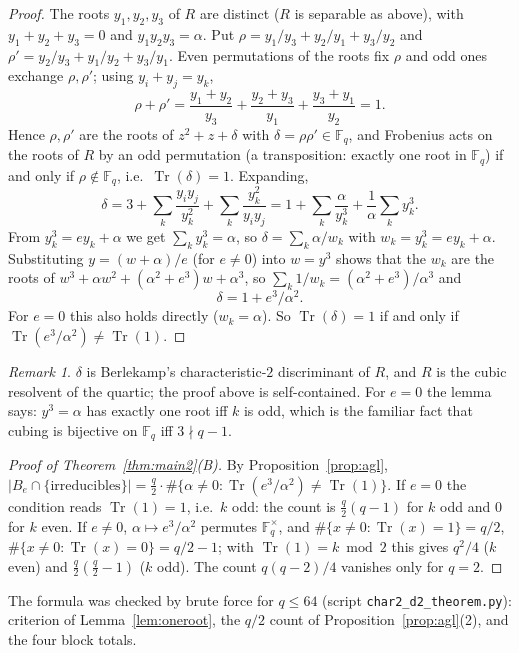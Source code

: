 \documentclass[11pt,a4paper]{amsart}
\theoremstyle{definition}
\theoremstyle{remark}
\newtheorem{remark}[theorem]{Remark}
\newcommand{\F}{\mathbb{F}}
\newcommand{\Tr}{\operatorname{Tr}}
\begin{document}
\begin{proof}
The roots $y_1,y_2,y_3$ of $R$ are distinct ($R$ is separable as above), with $y_1+y_2+y_3=0$ and $y_1y_2y_3=\alpha$.
Put $\rho=y_1/y_3+y_2/y_1+y_3/y_2$ and $\rho'=y_2/y_3+y_1/y_2+y_3/y_1$. Even permutations of the roots fix $\rho$ and
odd ones exchange $\rho,\rho'$; using $y_i+y_j=y_k$,
\[
\rho+\rho'=\frac{y_1+y_2}{y_3}+\frac{y_2+y_3}{y_1}+\frac{y_3+y_1}{y_2}=1 .
\]
Hence $\rho,\rho'$ are the roots of $z^2+z+\delta$ with $\delta=\rho\rho'\in\F_q$, and Frobenius acts on the roots of
$R$ by an odd permutation (a transposition: exactly one root in $\F_q$) if and only if $\rho\notin\F_q$, i.e.\
$\Tr(\delta)=1$. Expanding,
\[
\delta=3+\sum_k\frac{y_iy_j}{y_k^2}+\sum_k\frac{y_k^2}{y_iy_j}
=1+\sum_k\frac{\alpha}{y_k^3}+\frac{1}{\alpha}\sum_k y_k^3 .
\]
From $y_k^3=ey_k+\alpha$ we get $\sum_k y_k^3=\alpha$, so $\delta=\sum_k\alpha/w_k$ with $w_k=y_k^3=ey_k+\alpha$.
Substituting $y=(w+\alpha)/e$ (for $e\ne0$) into $w=y^3$ shows that the $w_k$ are the roots of
$w^3+\alpha w^2+(\alpha^2+e^3)w+\alpha^3$, so $\sum_k1/w_k=(\alpha^2+e^3)/\alpha^3$ and
\[
\delta=1+e^3/\alpha^2 .
\]
For $e=0$ this also holds directly ($w_k=\alpha$). So $\Tr(\delta)=1$ if and only if $\Tr(e^3/\alpha^2)\ne\Tr(1)$.
\end{proof}

\begin{remark}
$\delta$ is Berlekamp's characteristic-$2$ discriminant \cite{Berlekamp76} of $R$, and $R$ is the cubic resolvent of
the quartic; the proof above is self-contained. For $e=0$ the lemma says: $y^3=\alpha$ has exactly one root iff $k$ is
odd, which is the familiar fact that cubing is bijective on $\F_q$ iff $3\nmid q-1$.
\end{remark}

\begin{proof}[Proof of Theorem~\ref{thm:main2}(B)]
By Proposition~\ref{prop:agl}, $|B_e\cap\{\text{irreducibles}\}|=\frac q2\cdot\#\{\alpha\ne0:\Tr(e^3/\alpha^2)\ne\Tr(1)\}$.
If $e=0$ the condition reads $\Tr(1)=1$, i.e.\ $k$ odd: the count is $\frac q2(q-1)$ for $k$ odd and $0$ for $k$ even.
If $e\ne0$, $\alpha\mapsto e^3/\alpha^2$ permutes $\F_q^\times$, and $\#\{x\ne0:\Tr(x)=1\}=q/2$,
$\#\{x\ne0:\Tr(x)=0\}=q/2-1$; with $\Tr(1)=k\bmod2$ this gives $q^2/4$ ($k$ even) and $\frac q2(\frac q2-1)$ ($k$
odd). The count $q(q-2)/4$ vanishes only for $q=2$.
\end{proof}

The formula was checked by brute force for $q\le64$ (script \texttt{char2\_d2\_theorem.py}): criterion of
Lemma~\ref{lem:oneroot}, the $q/2$ count of Proposition~\ref{prop:agl}(2), and the four block totals.
\end{document}
